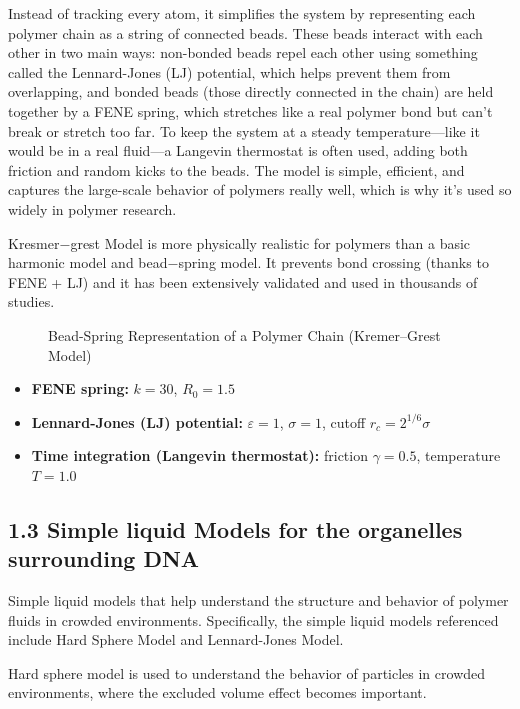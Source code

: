 \documentclass[12pt]{article}
\begin{document}
\begin{flushleft}
Instead of tracking every atom, it simplifies the system by representing each polymer chain as a string of connected beads. These beads interact with each other in two main ways: non-bonded beads repel each other using something called the Lennard-Jones (LJ) potential, which helps prevent them from overlapping, and bonded beads (those directly connected in the chain) are held together by a FENE spring, which stretches like a real polymer bond but can't break or stretch too far. To keep the system at a steady temperature—like it would be in a real fluid—a Langevin thermostat is often used, adding both friction and random kicks to the beads. The model is simple, efficient, and captures the large-scale behavior of polymers really well, which is why it's used so widely in polymer research.	
	

Kresmer$-$grest Model is more physically realistic for polymers than a basic harmonic model and bead$-$spring model.
It prevents bond crossing (thanks to FENE + LJ) and it has been extensively validated and used in thousands of studies.

\begin{figure}[!ht]
  \centering
  \caption{Bead-Spring Representation of a Polymer Chain (Kremer–Grest Model)}
\end{figure}


\begin{itemize}
  \item \textbf{FENE spring:} \( k = 30 \), \( R_0 = 1.5 \)
  \item \textbf{Lennard-Jones (LJ) potential:} \( \varepsilon = 1 \), \( \sigma = 1 \), cutoff \( r_c = 2^{1/6} \sigma \)
  \item \textbf{Time integration (Langevin thermostat):} friction \( \gamma = 0.5 \), temperature \( T = 1.0 \)
\end{itemize}


\subsection*{1.3 Simple liquid Models for the organelles surrounding DNA}

Simple liquid models that help understand the structure and behavior of polymer fluids in crowded environments. Specifically, the simple liquid models referenced include Hard Sphere Model and Lennard-Jones Model. 


Hard sphere model is used to understand the behavior of particles in crowded environments, where the excluded volume effect becomes important. 



\end{flushleft}
\end{document}
